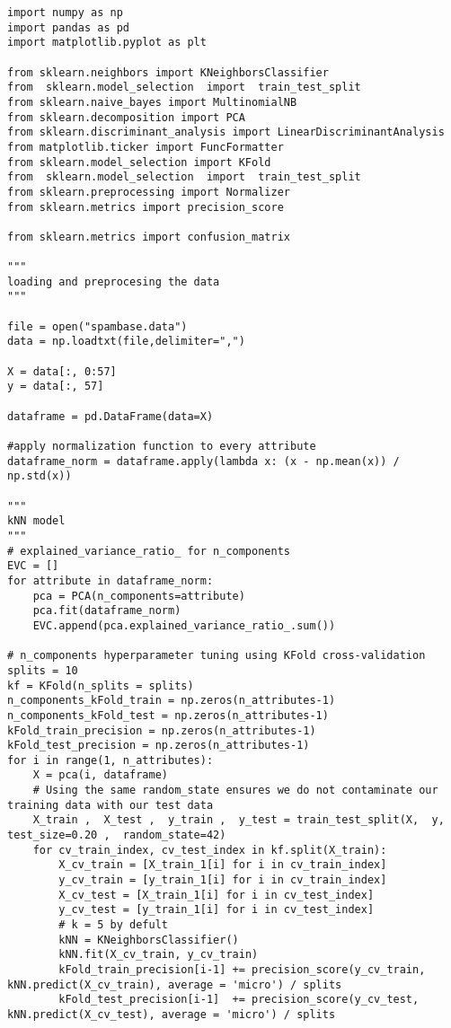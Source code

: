 \begin{lstlisting}
import numpy as np
import pandas as pd
import matplotlib.pyplot as plt

from sklearn.neighbors import KNeighborsClassifier
from  sklearn.model_selection  import  train_test_split
from sklearn.naive_bayes import MultinomialNB
from sklearn.decomposition import PCA
from sklearn.discriminant_analysis import LinearDiscriminantAnalysis
from matplotlib.ticker import FuncFormatter
from sklearn.model_selection import KFold
from  sklearn.model_selection  import  train_test_split
from sklearn.preprocessing import Normalizer
from sklearn.metrics import precision_score

from sklearn.metrics import confusion_matrix

"""
loading and preprocesing the data
"""

file = open("spambase.data")
data = np.loadtxt(file,delimiter=",")

X = data[:, 0:57]
y = data[:, 57]

dataframe = pd.DataFrame(data=X)

#apply normalization function to every attribute
dataframe_norm = dataframe.apply(lambda x: (x - np.mean(x)) / np.std(x))

"""
kNN model
"""
# explained_variance_ratio_ for n_components
EVC = []
for attribute in dataframe_norm:
    pca = PCA(n_components=attribute)
    pca.fit(dataframe_norm)
    EVC.append(pca.explained_variance_ratio_.sum())

# n_components hyperparameter tuning using KFold cross-validation
splits = 10
kf = KFold(n_splits = splits)
n_components_kFold_train = np.zeros(n_attributes-1)
n_components_kFold_test = np.zeros(n_attributes-1)
kFold_train_precision = np.zeros(n_attributes-1)
kFold_test_precision = np.zeros(n_attributes-1)
for i in range(1, n_attributes):
    X = pca(i, dataframe)
    # Using the same random_state ensures we do not contaminate our training data with our test data
    X_train ,  X_test ,  y_train ,  y_test = train_test_split(X,  y,  test_size=0.20 ,  random_state=42)
    for cv_train_index, cv_test_index in kf.split(X_train):
        X_cv_train = [X_train_1[i] for i in cv_train_index]
        y_cv_train = [y_train_1[i] for i in cv_train_index]
        X_cv_test = [X_train_1[i] for i in cv_test_index]
        y_cv_test = [y_train_1[i] for i in cv_test_index]
        # k = 5 by defult
        kNN = KNeighborsClassifier()
        kNN.fit(X_cv_train, y_cv_train) 
        kFold_train_precision[i-1] += precision_score(y_cv_train, kNN.predict(X_cv_train), average = 'micro') / splits
        kFold_test_precision[i-1]  += precision_score(y_cv_test, kNN.predict(X_cv_test), average = 'micro') / splits


\end{lstlisting}
